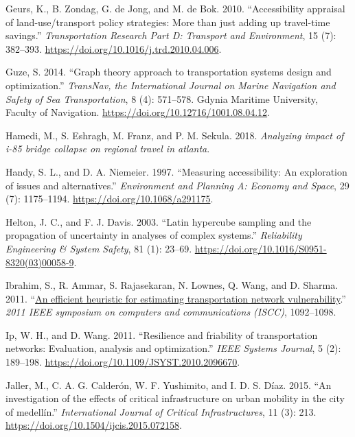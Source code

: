 \documentclass[]{ascelike-new}
\newlength{\cslhangindent}
\newenvironment{CSLReferences}[2] %
 {\begin{list}{}{%
  \setlength{\itemindent}{0pt}
  \setlength{\leftmargin}{0pt}
  \setlength{\parsep}{0pt}
  \ifodd #1
   \setlength{\leftmargin}{\cslhangindent}
   \setlength{\itemindent}{-1\cslhangindent}
  \fi
  \setlength{\itemsep}{#2\baselineskip}}}
 {\end{list}}
\begin{document}
\begin{CSLReferences}{1}{0}
Geurs, K., B. Zondag, G. de Jong, and M. de Bok. 2010. {``Accessibility
appraisal of land-use/transport policy strategies: More than just adding
up travel-time savings.''} \emph{Transportation Research Part D:
Transport and Environment}, 15 (7): 382--393.
\url{https://doi.org/10.1016/j.trd.2010.04.006}.

Guze, S. 2014. {``Graph theory approach to transportation systems design
and optimization.''} \emph{TransNav, the International Journal on Marine
Navigation and Safety of Sea Transportation}, 8 (4): 571--578. Gdynia
Maritime University, Faculty of Navigation.
\url{https://doi.org/10.12716/1001.08.04.12}.

Hamedi, M., S. Eshragh, M. Franz, and P. M. Sekula. 2018.
\emph{Analyzing impact of i-85 bridge collapse on regional travel in
atlanta}.

Handy, S. L., and D. A. Niemeier. 1997. {``Measuring accessibility: An
exploration of issues and alternatives.''} \emph{Environment and
Planning A: Economy and Space}, 29 (7): 1175--1194.
\url{https://doi.org/10.1068/a291175}.

Helton, J. C., and F. J. Davis. 2003. {``Latin hypercube sampling and
the propagation of uncertainty in analyses of complex systems.''}
\emph{Reliability Engineering \& System Safety}, 81 (1): 23--69.
\url{https://doi.org/10.1016/S0951-8320(03)00058-9}.

Ibrahim, S., R. Ammar, S. Rajasekaran, N. Lownes, Q. Wang, and D.
Sharma. 2011. {``\href{https://doi.org/10.1109/ISCC.2011.5983988}{An
efficient heuristic for estimating transportation network
vulnerability}.''} \emph{2011 IEEE symposium on computers and
communications (ISCC)}, 1092--1098.

Ip, W. H., and D. Wang. 2011. {``Resilience and friability of
transportation networks: Evaluation, analysis and optimization.''}
\emph{IEEE Systems Journal}, 5 (2): 189--198.
\url{https://doi.org/10.1109/JSYST.2010.2096670}.

Jaller, M., C. A. G. Calderón, W. F. Yushimito, and I. D. S. Díaz. 2015.
{``An investigation of the effects of critical infrastructure on urban
mobility in the city of medellín.''} \emph{International Journal of
Critical Infrastructures}, 11 (3): 213.
\url{https://doi.org/10.1504/ijcis.2015.072158}.


\end{CSLReferences}
\end{document}
